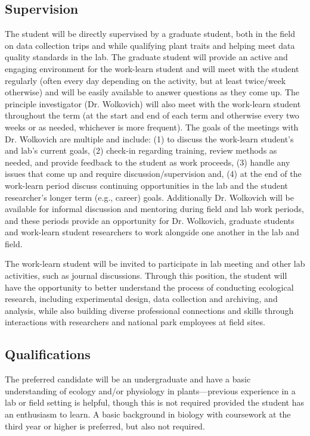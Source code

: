 \documentclass[11pt, oneside]{article}   	%
\begin{document}
\subsection {Supervision}
The student will be directly supervised by a graduate student, both in the field on data collection trips and while qualifying plant traits and helping meet data quality standards in the lab. The graduate student will provide an active and engaging environment for the work-learn student and will meet with the student regularly (often every day depending on the activity, but at least twice/week otherwise) and will be easily available to answer questions as they come up. The principle investigator (Dr. Wolkovich) will also meet with the work-learn student throughout the term (at the start and end of each term and otherwise every two weeks or as needed, whichever is more frequent). The goals of the meetings with Dr. Wolkovich are multiple and include: (1) to discuss the work-learn student's and lab's current goals, (2) check-in regarding training, review methods as needed, and provide feedback to the student as work proceeds, (3) handle any issues that come up and require discussion/supervision and, (4) at the end of the work-learn period discuss continuing opportunities in the lab and the student researcher's longer term (e.g., career) goals. Additionally Dr. Wolkovich will be available for informal discussion and mentoring during field and lab work periods, and these periods provide an opportunity for Dr. Wolkovich, graduate students and work-learn student researchers to work alongside one another in the lab and field. 

The work-learn student will be invited to participate in lab meeting and other lab activities, such as journal discussions. Through this position, the student will have the opportunity to better understand the process of conducting ecological research, including experimental design, data collection and archiving, and analysis, while also building diverse professional connections and skills through interactions with researchers and national park employees at field sites.  


\subsection {Qualifications}
The preferred candidate will be an undergraduate and have a basic understanding of ecology and/or physiology in plants---previous experience in a lab or field setting is helpful, though this is not required provided the student has an enthusiasm to learn. A basic background in biology with coursework at the third year or higher is preferred, but also not required. 
\end{document}
